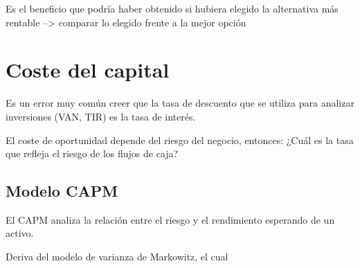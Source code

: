 Es el beneficio que podría haber obtenido si hubiera elegido la alternativa más rentable --> comparar lo elegido frente a la mejor opción

\section{Coste del capital}
Es un error muy común creer que la tasa de descuento que se utiliza para analizar inversiones (VAN, TIR) es la tasa de interés.

El coste de oportunidad depende del riesgo del negocio, entonces: ¿Cuál es la tasa que refleja el riesgo de los flujos de caja?

\subsection{Modelo CAPM}
El CAPM analiza la relación entre el riesgo y el rendimiento esperando de un activo. 

Deriva del modelo de varianza de Markowitz, el cual 